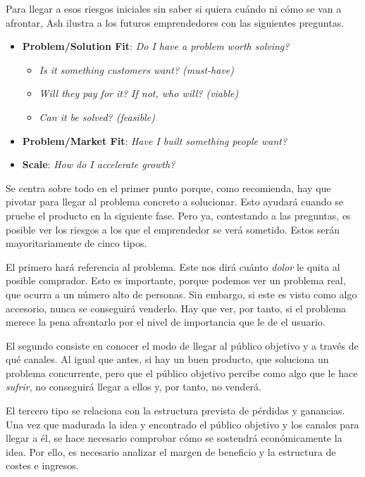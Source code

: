 
Para llegar a esos riesgos iniciales sin saber si quiera cuándo ni cómo se van a afrontar, Ash ilustra a los futuros emprendedores con las siguientes preguntas.

\begin{itemize}
    \item \textbf{Problem/Solution Fit}: \textit{Do I have a problem worth solving?}
    \begin{itemize}
        \item \textit{Is it something customers want? (must-have)}
        \item \textit{Will they pay for it? If not, who will? (viable)}
        \item \textit{Can it be solved? (feasible)}
    \end{itemize}
    \item \textbf{Problem/Market Fit}: \textit{Have I built something people want?}
    \item \textbf{Scale}: \textit{How do I accelerate growth?}
\end{itemize}

Se centra sobre todo en el primer punto porque, como recomienda, hay que pivotar para llegar al problema concreto a solucionar. Esto ayudará cuando se pruebe el producto en la siguiente fase. Pero ya, contestando a las preguntas, es posible ver los riesgos a los que el emprendedor se verá sometido. Estos serán mayoritariamente de cinco tipos.

El primero hará referencia al problema. Este nos dirá cuánto \textit{dolor} le quita al posible comprador. Esto es importante, porque podemos ver un problema real, que ocurra a un número alto de personas. Sin embargo, si este es visto como algo accesorio, nunca se conseguirá venderlo. Hay que ver, por tanto, si el problema merece la pena afrontarlo por el nivel de importancia que le de el usuario.

El segundo consiste en conocer el modo de llegar al público objetivo y a través de qué canales. Al igual que antes, si hay un buen producto, que soluciona un problema concurrente, pero que el público objetivo percibe como algo que le hace \textit{sufrir}, no conseguirá llegar a ellos y, por tanto, no venderá.

El tercero tipo se relaciona con la estructura prevista de pérdidas y ganancias. Una vez que madurada la idea y encontrado el público objetivo y los canales para llegar a él, se hace necesario comprobar cómo se sostendrá económicamente la idea. Por ello, es necesario analizar el margen de beneficio y la estructura de costes e ingresos.

